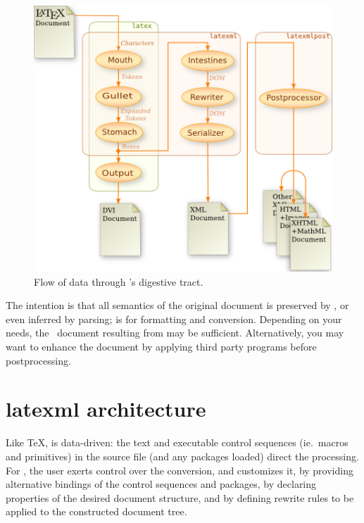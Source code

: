 \documentclass{book}
\begin{document}
\begin{figure}[tb]
\begin{center}
\includegraphics[width=\textwidth]{figures/digestion}
\end{center}
\caption{Flow of data through \LaTeXML's digestive tract.\label{fig:dataflow}}
\end{figure}

The intention is that all semantics of the original document is
preserved by , or even inferred by parsing;
 is for formatting and conversion.
Depending on your needs, the \LaTeXML\ document resulting from  may be
sufficient. Alternatively, you may want to enhance the document
by applying third party programs before postprocessing.

\section{latexml architecture}\label{latexmlarchitecture}
%
Like \TeX,  is data-driven: the text and executable control
sequences (ie.~macros and primitives)
in the source file (and any packages loaded) direct the processing.
For \LaTeXML, the user exerts control over the conversion, and customizes it, by 
providing alternative bindings of the control sequences and packages,
by declaring properties of the desired document structure,
and by defining rewrite rules to be applied to the constructed document tree.
\end{document}
